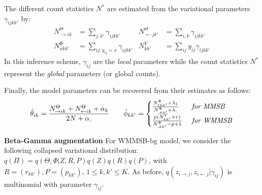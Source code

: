 The different count statistics $N^*$ are estimated from the variational parameters $\gamma_{ijkk'}$ by:
%
\begin{align} \label{eq:sss}
    N^{\Theta}_{\rightarrow ik} &= \sum_{j, k'} \gamma_{ijkk'}        & N^{\Theta}_{\leftarrow jk'} &= \sum_{i, k} \gamma_{ijkk'}  \nonumber \\
    N^{\Phi}_{xkk'} &= \sum_{ij:y_{ij}=x} \gamma_{ijkk'}  & N^{Y}_{kk'} &= \sum_{ij} y_{ij}\gamma_{ijkk'}
\end{align}
%
In this inference scheme, $\gamma_{ij}$ are the \emph{local} parameters while the count statistics $N^*$ represent the \emph{global} parameters (or global counts).  

Finally, the model parameters can be recovered from their estimates as follows:
%
\begin{align*}
\hat \theta_{ik} = \frac{N^{\Theta}_{\rightarrow ik} + N^{\Theta}_{\leftarrow ik} + \alpha_k}{2N + \alpha_{\bm{.}}} \qquad 
\hat \phi_{kk'}=\begin{cases}
     \frac{N^{\Phi}_{1 kk'} + \lambda_1}{N^{\Phi}_{\bm{.}kk'} + \lambda_{\bm{.}}} & \textrm{ \textit{for MMSB}} \\
    \frac{p(N^Y_{kk'} + r)}{N^{\Phi}_{\bm{.}kk'} - p + 1}  & \textrm{ \textit{for WMMSB}}  %
    \end{cases}
\end{align*}

\textbf{Beta-Gamma augmentation} For WMMSB-bg model, we consider the following collapsed variational distribution: $q(\Pi) = q(\Theta, \Phi|Z, R, P)q(Z)q(R)q(P)$,
with $R=(r_{kk'}), P=(p_{kk'}), \, 1 \le k,k' \le K$. As before, $q(z_{i \rightarrow j}, z_{i \leftarrow j}|\gamma_{ij})$ is multinomial with parameter $\gamma_{ij}$. 

